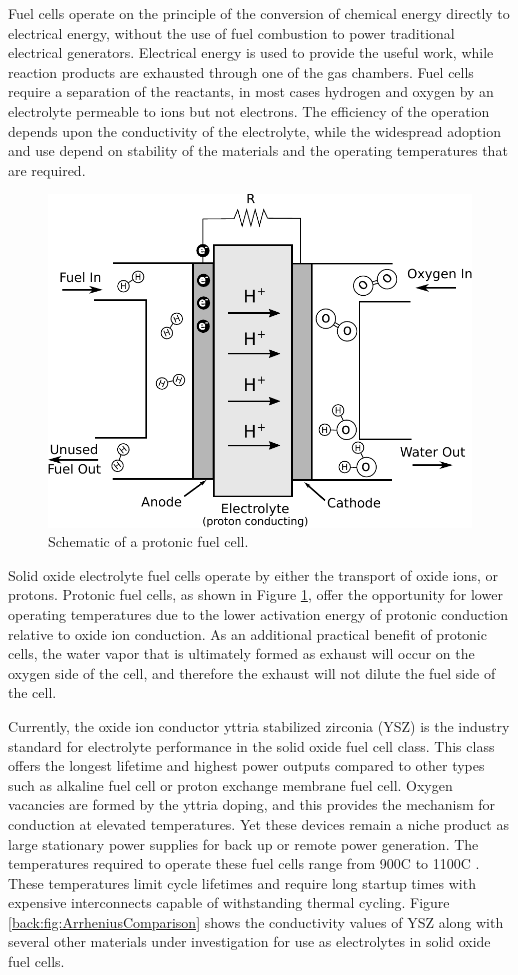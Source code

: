 Fuel cells operate on the principle of the conversion of chemical energy directly to electrical energy, without the use of fuel combustion to power traditional electrical generators. Electrical energy is used to provide the useful work, while reaction products are exhausted through one of the gas chambers. Fuel cells require a separation of the reactants, in most cases hydrogen and oxygen by an electrolyte permeable to ions but not electrons. The efficiency of the operation depends upon the conductivity of the electrolyte, while the widespread adoption and use depend on stability of the materials and the operating temperatures that are required.
\begin{figure}
    \centering
    \includegraphics[width=.8\linewidth]{Figures/fuelCell2.pdf}
    \caption{Schematic of a protonic fuel cell.}
    \label{back:fig:fuelCell}
\end{figure}

Solid oxide electrolyte fuel cells operate by either the transport of oxide ions, or protons. Protonic fuel cells, as shown in Figure \ref{back:fig:fuelCell}, offer the opportunity for lower operating temperatures due to the lower activation energy of protonic conduction relative to oxide ion conduction. As an additional practical benefit of protonic cells, the water vapor that is ultimately formed as exhaust will occur on the oxygen side of the cell, and therefore the exhaust will not dilute the fuel side of the cell.

Currently, the oxide ion conductor yttria stabilized zirconia (YSZ) is the industry standard for electrolyte performance in the solid oxide fuel cell class. This class offers the longest lifetime and highest power outputs compared to other types such as alkaline fuel cell or proton exchange membrane fuel cell. Oxygen vacancies are formed by the yttria doping, and this provides the mechanism for conduction at elevated temperatures. Yet these devices remain a niche product as large stationary power supplies for back up or remote power generation. The temperatures required to operate these fuel cells range from 900\textdegree C to 1100\textdegree C \cite{Zhang2018}. These temperatures limit cycle lifetimes and require long startup times with expensive interconnects capable of withstanding thermal cycling. Figure \ref{back:fig:ArrheniusComparison} shows the conductivity values of YSZ along with several other materials under investigation for use as electrolytes in solid oxide fuel cells. 

